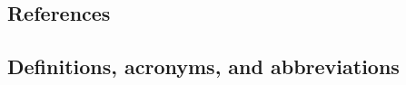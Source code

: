 \subsection{References}

\renewcommand{\refname}{}


\subsection{Definitions, acronyms, and abbreviations \label{sect:acronyms}}





